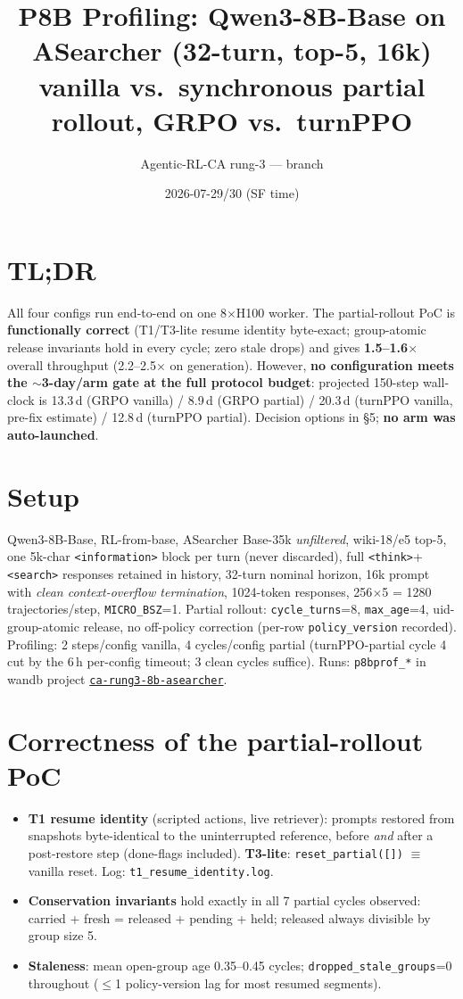 \documentclass[10pt]{article}
\title{\vspace{-1.2em}P8B Profiling: Qwen3-8B-Base on ASearcher (32-turn, top-5, 16k)\\
\large vanilla vs.\ synchronous partial rollout, GRPO vs.\ turnPPO\vspace{-0.6em}}
\author{Agentic-RL-CA rung-3 --- branch \code{sync-partial-rollout-poc}}
\date{2026-07-29/30 \; (SF time)}
\newcommand{\code}[1]{\texttt{\small #1}}
\begin{document}
\maketitle
\vspace{-1.6em}

\section*{TL;DR}
All four configs run end-to-end on one 8$\times$H100 worker. The partial-rollout PoC is
\textbf{functionally correct} (T1/T3-lite resume identity byte-exact; group-atomic release
invariants hold in every cycle; zero stale drops) and gives \textbf{1.5--1.6$\times$}
overall throughput (2.2--2.5$\times$ on generation). However, \textbf{no configuration meets
the $\sim$3-day/arm gate at the full protocol budget}: projected 150-step wall-clock is
13.3\,d (GRPO vanilla) / 8.9\,d (GRPO partial) / 20.3\,d (turnPPO vanilla, pre-fix estimate)
/ 12.8\,d (turnPPO partial). Decision options in \S5; \textbf{no arm was auto-launched}.

\section{Setup}
Qwen3-8B-Base, RL-from-base, ASearcher Base-35k \emph{unfiltered}, wiki-18/e5 top-5,
one 5k-char \code{<information>} block per turn (never discarded), full
\code{<think>}+\code{<search>} responses retained in history, 32-turn nominal horizon,
16k prompt with \emph{clean context-overflow termination}, 1024-token responses,
256$\times$5 = 1280 trajectories/step, \code{MICRO\_BSZ}=1. Partial rollout:
\code{cycle\_turns}=8, \code{max\_age}=4, uid-group-atomic release, no off-policy
correction (per-row \code{policy\_version} recorded). Profiling: 2 steps/config vanilla,
4 cycles/config partial (turnPPO-partial cycle 4 cut by the 6\,h per-config timeout;
3 clean cycles suffice). Runs: \code{p8bprof\_*} in wandb project
\href{https://wandb.ai/rainyfields/ca-rung3-8b-asearcher}{\code{ca-rung3-8b-asearcher}}.

\section{Correctness of the partial-rollout PoC}
\begin{itemize}
\item \textbf{T1 resume identity} (scripted actions, live retriever): prompts restored from
snapshots byte-identical to the uninterrupted reference, before \emph{and} after a
post-restore step (done-flags included). \textbf{T3-lite}: \code{reset\_partial([])}
$\equiv$ vanilla reset. Log: \code{t1\_resume\_identity.log}.
\item \textbf{Conservation invariants} hold exactly in all 7 partial cycles observed:
carried + fresh = released + pending + held; released always divisible by group size 5.
\item \textbf{Staleness}: mean open-group age 0.35--0.45 cycles; \code{dropped\_stale\_groups}=0
throughout ($\le$1 policy-version lag for most resumed segments).
\end{itemize}
\end{document}
